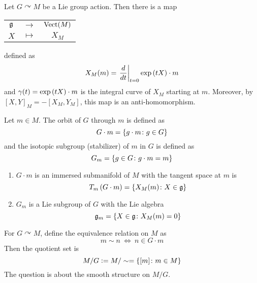 \documentclass[a4paper,12pt]{article}
\begin{document}
	Let $G \curvearrowright M$ be a Lie group action. Then there is a map
	\begin{center}
		\begin{tabular}{c c c}
			$\mathfrak{g}$ & $\longrightarrow$ & $\operatorname{Vect}(M)$ \\
			$X$ & $\longmapsto$ & $X_M$
		\end{tabular}
	\end{center}
	defined as
	\begin{equation*}
		X_M(m) = \left.\frac{d}{dt}\right\lvert_{t=0}\exp\left(tX\right)\cdot m
	\end{equation*}
	and $\gamma(t) = \exp\left(tX\right)\cdot m$ is the integral curve of $X_M$ starting at $m$. Moreover, by $[X,Y]_M = -[X_M,Y_M]$, this map is an anti-homomorphism. 
	\begin{prop}
		Let $m \in M$. The orbit of $G$ through $m$ is defined as
		\begin{equation*}
			G \cdot m = \left\{g \cdot m \colon g \in G\right\}
		\end{equation*}
		and the isotopic subgroup (stabilizer) of $m$ in $G$ is defined as
		\begin{equation*}
			G_m = \left\{g \in G \colon g \cdot m = m\right\}
		\end{equation*}
		\begin{enumerate}
			\item $G \cdot m$ is an immersed submanifold of $M$ with the tangent space at $m$ is
			\begin{equation*}
				T_m\left(G \cdot m\right) = \left\{X_M(m) \colon X  \in \mathfrak{g}\right\}
			\end{equation*}
			\item $G_m$ is a Lie subgroup of $G$ with the Lie algebra
			\begin{equation*}
				\mathfrak{g}_m = \left\{X \in \mathfrak{g} \colon X_M(m) = 0\right\}
			\end{equation*}
		\end{enumerate}
	\end{prop}
	For $G \curvearrowright M$, define the equivalence relation on $M$ as
	\begin{equation*}
		m \sim n ~\Leftrightarrow~ n \in G\cdot m
	\end{equation*}
	Then the quotient set is
	\begin{equation*}
		M / G \vcentcolon= M / \sim = \left\{[m]  \colon m \in M\right\}
	\end{equation*}
	The question is about the smooth structure on $M / G$.
\end{document}
